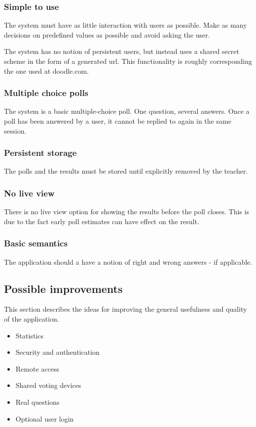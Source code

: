 \documentclass{acm_proc_article-sp}
\begin{document}
\subsubsection*{Simple to use}
The system must have as little interaction with users as possible. Make as many decisions on predefined values as possible and avoid asking the user.

The system has no notion of persistent users, but instead uses a shared secret scheme in the form of a generated url. This functionality is roughly corresponding the one used at doodle.com.

\subsubsection*{Multiple choice polls}
The system is a basic multiple-choice poll. One question, several answers. Once a poll has been answered by a user, it cannot be replied to again in the same session.

\subsubsection*{Persistent storage}
The polls and the results must be stored until explicitly removed by the teacher.

\subsubsection*{No live view}
There is no live view option for showing the results before the poll closes. This is due to the fact early poll estimates can have effect on the result.

\subsubsection*{Basic semantics}
The application should a have a notion of right and wrong answers - if applicable.

\subsection{Possible improvements}
This section describes the ideas for improving the general usefulness and quality of the application.
\begin{itemize}
  \item Statistics
  \item Security and authentication
  \item Remote access 
  \item Shared voting devices 
  \item Real questions
  \item Optional user login
\end{itemize}
\end{document}
